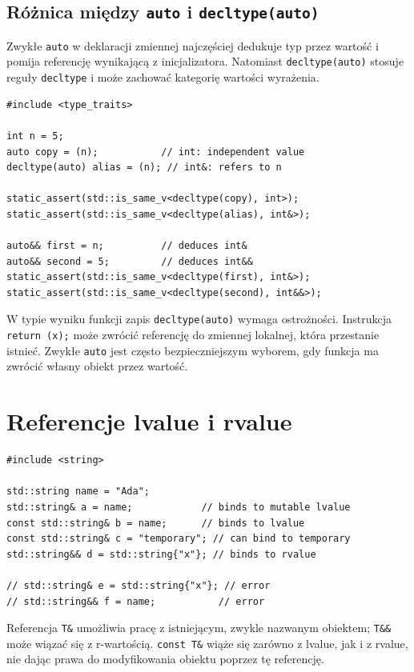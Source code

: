 \subsection{Różnica między \texttt{auto} i \texttt{decltype(auto)}}

Zwykłe \texttt{auto} w deklaracji zmiennej najczęściej dedukuje typ
przez wartość i pomija referencję wynikającą z inicjalizatora.
Natomiast \texttt{decltype(auto)} stosuje reguły \texttt{decltype}
i może zachować kategorię wartości wyrażenia.

\begin{lstlisting}
#include <type_traits>

int n = 5;
auto copy = (n);           // int: independent value
decltype(auto) alias = (n); // int&: refers to n

static_assert(std::is_same_v<decltype(copy), int>);
static_assert(std::is_same_v<decltype(alias), int&>);

auto&& first = n;          // deduces int&
auto&& second = 5;         // deduces int&&
static_assert(std::is_same_v<decltype(first), int&>);
static_assert(std::is_same_v<decltype(second), int&&>);
\end{lstlisting}

W typie wyniku funkcji zapis \texttt{decltype(auto)} wymaga
ostrożności. Instrukcja \texttt{return (x);} może zwrócić
referencję do zmiennej lokalnej, która przestanie istnieć.
Zwykłe \texttt{auto} jest często bezpieczniejszym wyborem,
gdy funkcja ma zwrócić własny obiekt przez wartość.

\section{Referencje lvalue i rvalue}
\label{sec:move-references}

\begin{lstlisting}
#include <string>

std::string name = "Ada";
std::string& a = name;            // binds to mutable lvalue
const std::string& b = name;      // binds to lvalue
const std::string& c = "temporary"; // can bind to temporary
std::string&& d = std::string{"x"}; // binds to rvalue

// std::string& e = std::string{"x"}; // error
// std::string&& f = name;           // error
\end{lstlisting}

Referencja \texttt{T\&} umożliwia pracę z istniejącym, zwykle
nazwanym obiektem; \texttt{T\&\&} może wiązać się z r-wartością.
\texttt{const T\&} wiąże się zarówno z lvalue, jak i z rvalue,
nie dając prawa do modyfikowania obiektu poprzez tę referencję.

